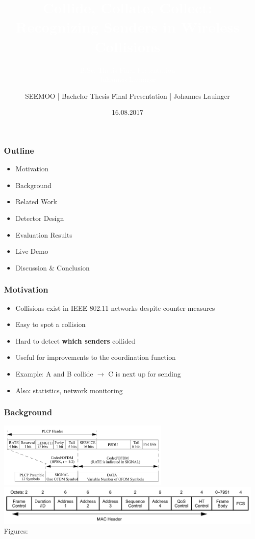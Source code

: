 \documentclass[accentcolor=tud8b,colorbacktitle]{tudbeamer}
\title{\textcolor{white}{Collide, Collate, Collect: Recognizing Senders in Wireless Collisions\\}}
\subtitle{\textcolor{white}{B.Sc. Thesis Final Presentation\\Johannes Lauinger}}
\author{SEEMOO | Bachelor Thesis Final Presentation | Johannes Lauinger}
\date{16.08.2017}
\begin{document}
\begin{titleframe}
\end{titleframe}


\begin{frame}
\frametitle{Outline}
\begin{itemize}
	\setlength\itemsep{1em}
	\item Motivation
	\item Background
	\item Related Work
	\item Detector Design
	\item Evaluation Results
	\item Live Demo
	\item Discussion \& Conclusion
\end{itemize}
\end{frame}


\begin{frame}
\frametitle{Motivation}
\begin{itemize}
	\setlength\itemsep{1em}
	\item Collisions exist in IEEE 802.11 networks despite counter-measures
	\item Easy to spot a collision
	\item Hard to detect \textbf{which senders} collided \cite{choi2013, keene2010}
	\item Useful for improvements to the coordination function
	\item Example: A and B collide $\rightarrow$ C is next up for sending
	\item Also: statistics, network monitoring
\end{itemize}
\end{frame}


\begin{frame}
\frametitle{Background}
\begin{centering}
	\includegraphics[width=8.5cm]{assets/phy-format}\\
	\vspace{0.3cm}
	\includegraphics[width=\textwidth]{assets/mac-format}\\
	\small Figures: \cite{ieee2012} \normalsize\\~\\
\end{centering}
\end{frame}
\end{document}
